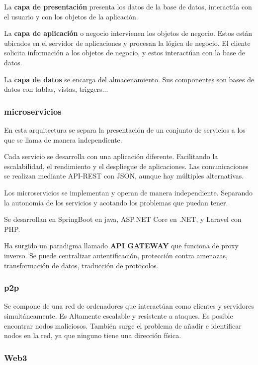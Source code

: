         La \textbf{capa de presentación} presenta los datos de la base de datos, interactúa con el usuario y con los objetos de la aplicación.

        La \textbf{capa de aplicación} o negocio intervienen los objetos de negocio. Estos están ubicados en el servidor de aplicaciones y procesan la lógica de negocio. El cliente solicita información a los objetos de negocio, y estos interactúan con la base de datos.

        La \textbf{capa de datos} se encarga del almacenamiento. Sus componentes son bases de datos con tablas, vistas, triggers...

    \subsubsection{microservicios}

        En esta arquitectura se separa la presentación de un conjunto de servicios a los que se llama de manera independiente.

        Cada servicio se desarrolla con una aplicación diferente. Facilitando la escalabilidad, el rendimiento y el despliegue de aplicaciones. Las comunicaciones se realizan mediante API-REST con JSON, aunque hay múltiples alternativas.

        Los microservicios se implementan y operan de manera independiente. Separando la autonomía de los servicios y acotando los problemas que puedan tener.

        Se desarrollan en SpringBoot en java, ASP.NET Core en .NET, y Laravel con PHP.

        Ha surgido un paradigma llamado \textbf{API GATEWAY} que funciona de proxy inverso. Se puede centralizar autentificación, protección contra amenazas, transformación de datos, traducción de protocolos.

    \subsubsection{p2p}

        Se compone de una red de ordenadores que interactúan como clientes y servidores simultáneamente. Es Altamente escalable y resistente a ataques. Es posible encontrar nodos maliciosos. También surge el problema de añadir e identificar nodos en la red, ya que ninguno tiene una dirección física.

    \subsubsection{Web3}

